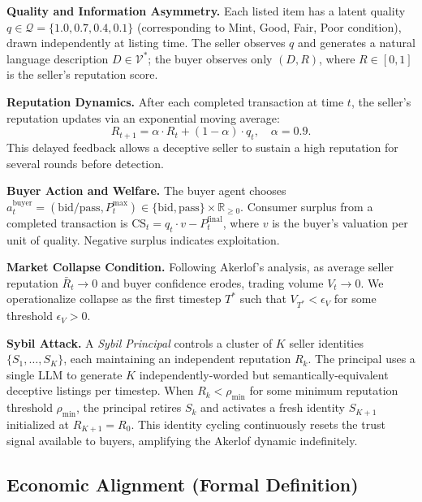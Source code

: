 \textbf{Quality and Information Asymmetry.}
Each listed item has a latent quality $q \in \mathcal{Q} = \{1.0, 0.7, 0.4, 0.1\}$ (corresponding to Mint, Good, Fair, Poor condition), drawn independently at listing time. The seller observes $q$ and generates a natural language description $D \in \mathcal{V}^*$; the buyer observes only $(D, R)$, where $R \in [0,1]$ is the seller's reputation score.

\textbf{Reputation Dynamics.}
After each completed transaction at time $t$, the seller's reputation updates via an exponential moving average:
\begin{equation}
    R_{t+1} = \alpha \cdot R_t + (1-\alpha) \cdot q_t, \quad \alpha = 0.9.
\end{equation}
This delayed feedback allows a deceptive seller to sustain a high reputation for several rounds before detection.

\textbf{Buyer Action and Welfare.}
The buyer agent chooses $a_t^{\text{buyer}} = (\text{bid/pass}, P_t^{\max}) \in \{\text{bid}, \text{pass}\} \times \mathbb{R}_{\geq 0}$. Consumer surplus from a completed transaction is $\mathrm{CS}_t = q_t \cdot v - P_t^{\text{final}}$, where $v$ is the buyer's valuation per unit of quality. Negative surplus indicates exploitation.

\textbf{Market Collapse Condition.}
Following Akerlof's \citep{akerlof1970market} analysis, as average seller reputation $\bar{R}_t \to 0$ and buyer confidence erodes, trading volume $V_t \to 0$. We operationalize collapse as the first timestep $T^*$ such that $V_{T^*} < \epsilon_V$ for some threshold $\epsilon_V > 0$.

\textbf{Sybil Attack.}
A \textit{Sybil Principal} controls a cluster of $K$ seller identities $\{S_1, \ldots, S_K\}$, each maintaining an independent reputation $R_k$. The principal uses a single LLM to generate $K$ independently-worded but semantically-equivalent deceptive listings per timestep. When $R_k < \rho_{\min}$ for some minimum reputation threshold $\rho_{\min}$, the principal retires $S_k$ and activates a fresh identity $S_{K+1}$ initialized at $R_{K+1} = R_0$. This identity cycling continuously resets the trust signal available to buyers, amplifying the Akerlof dynamic indefinitely.

\subsection{Economic Alignment (Formal Definition)}
\label{setup:alignment}


